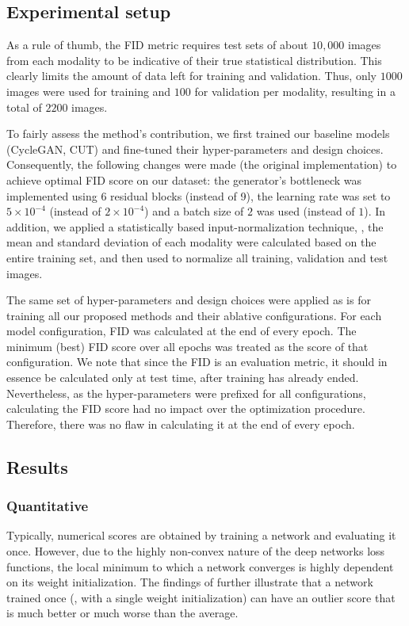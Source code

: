 \subsection{Experimental setup}
As a rule of thumb, the FID metric requires test sets of about $10,000$ images from each modality to be indicative of their true statistical distribution. 
This clearly limits the amount of data left for training and validation.
Thus, only $1000$ images were used for training and $100$ for validation per modality, resulting in a total of $2200$ images.

To fairly assess the method's contribution, we first trained our baseline models (CycleGAN, CUT) and fine-tuned their hyper-parameters and design choices.
Consequently, the following changes were made (\wrt the original implementation) to achieve optimal FID score on our dataset: 
the generator's bottleneck was implemented using 6 residual blocks (instead of 9), the learning rate was set to $5 \times 10^{-4}$ (instead of $2 \times 10^{-4}$) and a batch size of $2$ was used (instead of $1$).
In addition, we applied a statistically based input-normalization technique, \ie, the mean and standard deviation of each modality were calculated based on the entire training set, and then used to normalize all training, validation and test images.

The same set of hyper-parameters and design choices were applied as is for training all our proposed methods and their ablative configurations.
For each model configuration, FID was calculated at the end of every epoch.
The minimum (best) FID score over all epochs was treated as the score of that configuration.
We note that since the FID is an evaluation metric, it should in essence be calculated only at test time, after training has already ended. 
Nevertheless, as the hyper-parameters were prefixed for all configurations, calculating the FID score had no impact over the optimization procedure.
Therefore, there was no flaw in calculating it at the end of every epoch.

\subsection{Results}
\subsubsection{Quantitative}
Typically, numerical scores are obtained by training a network and evaluating it once.
However, due to the highly non-convex nature of the deep networks loss functions, the local minimum to which a network converges is highly dependent on its weight initialization.
The findings of \cite{picard2021torch} further illustrate that a network trained once (\ie, with a single weight initialization) can have an outlier score that is much better or much worse than the average.

